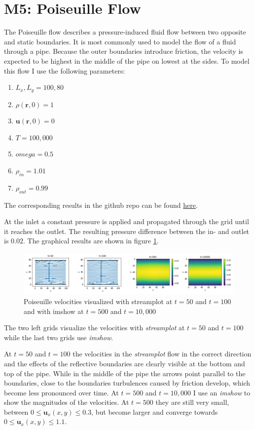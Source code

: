 \section{M5: Poiseuille Flow}
The Poiseuille flow describes a pressure-induced fluid flow between two opposite and static boundaries. 
It is most commonly used to model the flow of a fluid through a pipe. 
Because the outer boundaries introduce friction, the velocity is expected to be highest in the middle of the pipe on lowest at the sides.
To model this flow I use the following parameters:
\begin{enumerate}
    \item $L_{x}, L_{y} = 100, 80$
    \item $\rho(\textbf{r}, 0) = 1$
    \item $\textbf{u}(\textbf{r}, 0) = 0$
    \item $T = 100,000$
    \item $omega = 0.5$
    \item $\rho_{in} = 1.01$
    \item $\rho_{out} = 0.99$
\end{enumerate}
The corresponding results in the github repo can be found  \href{https://github.com/jonas27/pylbm/blob/master/milestones/m5/m5.ipynb}{here}.

At the inlet a constant pressure is applied and propagated through the grid until it reaches the outlet. The resulting pressure difference between the in- and outlet is $0.02$. 
The graphical results are shown in figure \ref{fig:m5-1-vel-time}.
\begin{figure}[ht]
\centering
\includegraphics[width=\columnwidth]{milestones/final/img/m5-1-vel-time.png}
\vspace*{-4mm}
\caption[Poiseuille Velocities]{Poiseuille velocities visualized with streamplot at $t=50$ and $t=100$ and with imshow at $t=500$ and $t=10,000$ }
\label{fig:m5-1-vel-time}
\end{figure}
The two left grids visualize the velocities with \textit{streamplot} at $t=50$ and $t=100$ while the last two grids use \textit{imshow}. 

At $t=50$ and $t=100$ the velocities in the \textit{streamplot} flow in the correct direction and the effects of the reflective boundaries are clearly visible at the bottom and top of the pipe. While in the middle of the pipe the arrows point parallel to the boundaries, close to the boundaries turbulences caused by friction develop, which become less pronounced over time.
At $t=500$ and $t=10,000$ I use an \textit{imshow} to show the magnitudes of the velocities.
At $t=500$ they are still very small, between $0\leq\textbf{u}_{x}(x,y)\leq0.3$, but become larger and converge towards $0\leq\textbf{u}_{x}(x,y)\leq1.1$.

